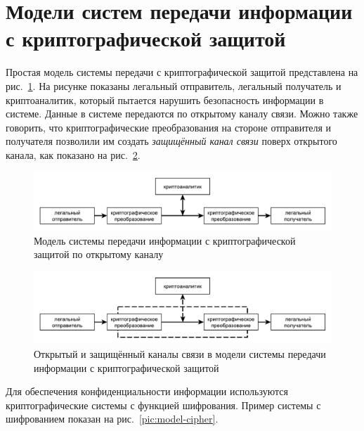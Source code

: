 \section[Модели систем передачи информации]{Модели систем передачи информации с криптографической защитой}

Простая модель системы передачи с криптографической защитой представлена на рис.~\ref{pic:model-simple}. На рисунке показаны легальный отправитель, легальный получатель и криптоаналитик, который пытается нарушить безопасность информации в системе. Данные в системе передаются по открытому каналу связи. Можно также говорить, что криптографические преобразования на стороне отправителя и получателя позволили им создать \emph{защищённый канал связи} поверх открытого канала, как показано на рис.~\ref{pic:model-simple-with-channel}.

\begin{figure}[!thb]
	\centering
	\includegraphics[width=1.0\textwidth]{pic/model-simple}
	\caption{Модель системы передачи информации с криптографической защитой по открытому каналу\label{pic:model-simple}}
\end{figure}

\begin{figure}[!thb]
	\centering
	\includegraphics[width=1.0\textwidth]{pic/model-simple-with-channel}
	\caption{Открытый и защищённый каналы связи в модели системы передачи информации с криптографической защитой\label{pic:model-simple-with-channel}}
\end{figure}

Для обеспечения конфиденциальности информации используются криптографические системы с функцией шифрования. Пример системы с шифрованием показан на рис.~\ref{pic:model-cipher}.

